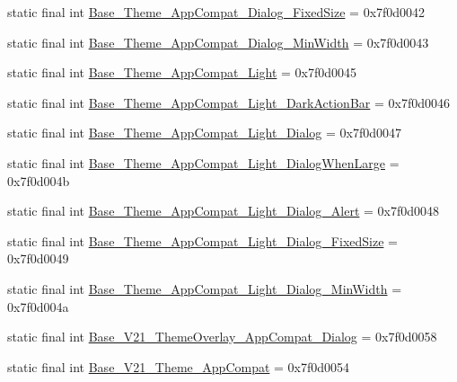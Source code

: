 \begin{DoxyCompactItemize}
\item 
static final int \mbox{\hyperlink{classcom_1_1synnapps_1_1carouselview_1_1_r_1_1style_a2901a96ece87362b66f15b365b4f78d5}{Base\+\_\+\+Theme\+\_\+\+App\+Compat\+\_\+\+Dialog\+\_\+\+Fixed\+Size}} = 0x7f0d0042
\item 
static final int \mbox{\hyperlink{classcom_1_1synnapps_1_1carouselview_1_1_r_1_1style_a05ee5a702e7fa5a72a59150e839134ca}{Base\+\_\+\+Theme\+\_\+\+App\+Compat\+\_\+\+Dialog\+\_\+\+Min\+Width}} = 0x7f0d0043
\item 
static final int \mbox{\hyperlink{classcom_1_1synnapps_1_1carouselview_1_1_r_1_1style_a60ad49ccfde6a1ddaa20d54aece56205}{Base\+\_\+\+Theme\+\_\+\+App\+Compat\+\_\+\+Light}} = 0x7f0d0045
\item 
static final int \mbox{\hyperlink{classcom_1_1synnapps_1_1carouselview_1_1_r_1_1style_a1111ad6e4f406386be9174050322a878}{Base\+\_\+\+Theme\+\_\+\+App\+Compat\+\_\+\+Light\+\_\+\+Dark\+Action\+Bar}} = 0x7f0d0046
\item 
static final int \mbox{\hyperlink{classcom_1_1synnapps_1_1carouselview_1_1_r_1_1style_af082f49fba96ebb9c0edc51f9c26a807}{Base\+\_\+\+Theme\+\_\+\+App\+Compat\+\_\+\+Light\+\_\+\+Dialog}} = 0x7f0d0047
\item 
static final int \mbox{\hyperlink{classcom_1_1synnapps_1_1carouselview_1_1_r_1_1style_ac9666c3ed9552c57f1a8e7aeffd0053e}{Base\+\_\+\+Theme\+\_\+\+App\+Compat\+\_\+\+Light\+\_\+\+Dialog\+When\+Large}} = 0x7f0d004b
\item 
static final int \mbox{\hyperlink{classcom_1_1synnapps_1_1carouselview_1_1_r_1_1style_a0c1335ce4fb5cef6dec879920363b5cb}{Base\+\_\+\+Theme\+\_\+\+App\+Compat\+\_\+\+Light\+\_\+\+Dialog\+\_\+\+Alert}} = 0x7f0d0048
\item 
static final int \mbox{\hyperlink{classcom_1_1synnapps_1_1carouselview_1_1_r_1_1style_a6754cdb7f6bb4c2beaa0870290a30a83}{Base\+\_\+\+Theme\+\_\+\+App\+Compat\+\_\+\+Light\+\_\+\+Dialog\+\_\+\+Fixed\+Size}} = 0x7f0d0049
\item 
static final int \mbox{\hyperlink{classcom_1_1synnapps_1_1carouselview_1_1_r_1_1style_a373c5ab62175dcfde9ebd097e17e1146}{Base\+\_\+\+Theme\+\_\+\+App\+Compat\+\_\+\+Light\+\_\+\+Dialog\+\_\+\+Min\+Width}} = 0x7f0d004a
\item 
static final int \mbox{\hyperlink{classcom_1_1synnapps_1_1carouselview_1_1_r_1_1style_ae5ac43a9705cfa0234876c75b972ce03}{Base\+\_\+\+V21\+\_\+\+Theme\+Overlay\+\_\+\+App\+Compat\+\_\+\+Dialog}} = 0x7f0d0058
\item 
static final int \mbox{\hyperlink{classcom_1_1synnapps_1_1carouselview_1_1_r_1_1style_a9299cd0e71d2f575e83fbb336df88f9b}{Base\+\_\+\+V21\+\_\+\+Theme\+\_\+\+App\+Compat}} = 0x7f0d0054

\end{DoxyCompactItemize}
